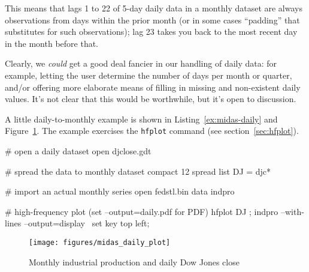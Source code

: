 This means that lags 1 to 22 of 5-day daily data in a monthly dataset
are always observations from days within the prior month (or in some
cases ``padding'' that substitutes for such observations); lag 23
takes you back to the most recent day in the month before that.

Clearly, we \textit{could} get a good deal fancier in our handling of
daily data: for example, letting the user determine the number of days
per month or quarter, and/or offering more elaborate means of filling
in missing and non-existent daily values. It's not clear that this
would be worthwhile, but it's open to discussion.

A little daily-to-monthly example is shown in
Listing~\ref{ex:midas-daily} and Figure~\ref{fig:daily}. The example
exercises the \texttt{hfplot} command (see section~\ref{sec:hfplot}).

\begin{script}[htbp]
\begin{scode}
# open a daily dataset
open djclose.gdt

# spread the data to monthly
dataset compact 12 spread
list DJ = djc*

# import an actual monthly series
open fedstl.bin
data indpro

# high-frequency plot (set --output=daily.pdf for PDF)
hfplot DJ ; indpro --with-lines --output=display \
 {set key top left;}
\end{scode}
\end{script}

\begin{figure}[htbp]
  \centering
  \texttt{[image: figures/midas\_daily\_plot]}
  \caption{Monthly industrial production and daily Dow Jones close}
  \label{fig:daily}
\end{figure}

